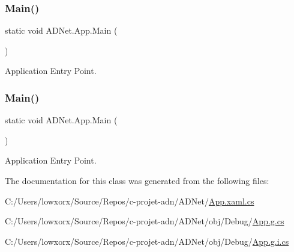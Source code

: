 \subsubsection{\texorpdfstring{Main()}{Main()}\hspace{0.1cm}{\footnotesize\ttfamily [1/2]}}
{\footnotesize\ttfamily static void A\+D\+Net.\+App.\+Main (\begin{DoxyParamCaption}{ }\end{DoxyParamCaption})\hspace{0.3cm}{\ttfamily [static]}}



Application Entry Point. 

\mbox{\label{class_a_d_net_1_1_app_a6c2fcfdd007be4acda04c6965191e42b}} 
\subsubsection{\texorpdfstring{Main()}{Main()}\hspace{0.1cm}{\footnotesize\ttfamily [2/2]}}
{\footnotesize\ttfamily static void A\+D\+Net.\+App.\+Main (\begin{DoxyParamCaption}{ }\end{DoxyParamCaption})\hspace{0.3cm}{\ttfamily [static]}}



Application Entry Point. 



The documentation for this class was generated from the following files\+:\begin{DoxyCompactItemize}
\item 
C\+:/\+Users/lowxorx/\+Source/\+Repos/c-\/projet-\/adn/\+A\+D\+Net/\hyperlink{_a_d_net_2_app_8xaml_8cs}{App.\+xaml.\+cs}\item 
C\+:/\+Users/lowxorx/\+Source/\+Repos/c-\/projet-\/adn/\+A\+D\+Net/obj/\+Debug/\hyperlink{_a_d_net_2obj_2_debug_2_app_8g_8cs}{App.\+g.\+cs}\item 
C\+:/\+Users/lowxorx/\+Source/\+Repos/c-\/projet-\/adn/\+A\+D\+Net/obj/\+Debug/\hyperlink{_a_d_net_2obj_2_debug_2_app_8g_8i_8cs}{App.\+g.\+i.\+cs}\end{DoxyCompactItemize}
